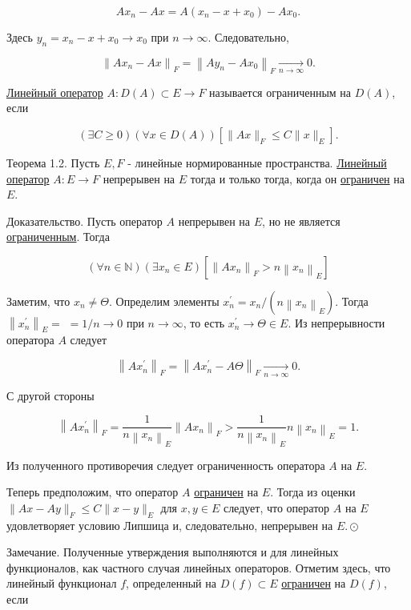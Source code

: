 \documentclass[a4paper, 12pt]{extarticle}
\begin{document}
$$
	A x_{n}-A x=A\left(x_{n}-x+x_{0}\right)-A x_{0} .
$$

Здесь $y_{n}=x_{n}-x+x_{0} \rightarrow x_{0}$ при $n \rightarrow \infty$. Следовательно,

$$
	\left\|A x_{n}-A x\right\|_{F}=\left\|A y_{n}-A x_{0}\right\|_{F} \underset{n \rightarrow \infty}{\longrightarrow} 0 .
$$

\hyperlink{linOperator}{Линейный оператор} $A: D(A) \subset E \rightarrow F$ называется \hypertarget{ogranichenn}{ограниченным} на $D(A)$, если

$$
	(\exists C \geq 0)(\forall x \in D(A))\left[\|A x\|_{F} \leq C\|x\|_{E}\right] .
$$

Теорема 1.2. Пусть $E, F$ - линейные нормированные пространства. \hyperlink{linOperator}{Линейный оператор} $A: E \rightarrow F$ непрерывен на $E$ тогда и только тогда, когда он \hyperlink{ogranichenn}{ограничен} на $E$.

Доказательство. Пусть оператор $A$ непрерывен на $E$, но не является \hyperlink{ogranichenn}{ограниченным}. Тогда

$$
	(\forall n \in \mathbb{N})\left(\exists x_{n} \in E\right)\left[\left\|A x_{n}\right\|_{F}>n\left\|x_{n}\right\|_{E}\right]
$$

Заметим, что $x_{n} \neq \Theta$. Определим элементы $x_{n}^{\prime}=x_{n} /\left(n\left\|x_{n}\right\|_{E}\right)$. Тогда $\left\|x_{n}^{\prime}\right\|_{E}=$ $=1 / n \rightarrow 0$ при $n \rightarrow \infty$, то есть $x_{n}^{\prime} \rightarrow \Theta \in E$. Из непрерывности оператора $A$ следует

$$
	\left\|A x_{n}^{\prime}\right\|_{F}=\left\|A x_{n}^{\prime}-A \Theta\right\|_{F} \underset{n \rightarrow \infty}{\longrightarrow} 0 .
$$

С другой стороны

$$
	\left\|A x_{n}^{\prime}\right\|_{F}=\frac{1}{n\left\|x_{n}\right\|_{E}}\left\|A x_{n}\right\|_{F}>\frac{1}{n\left\|x_{n}\right\|_{E}} n\left\|x_{n}\right\|_{E}=1 .
$$

Из полученного противоречия следует ограниченность оператора $A$ на $E$.

Теперь предположим, что оператор $A$ \hyperlink{ogranichenn}{ограничен} на $E$. Тогда из оценки $\|A x-A y\|_{F} \leq C\|x-y\|_{E}$ для $x, y \in E$ следует, что оператор $A$ на $E$ удовлетворяет условию Липшица и, следовательно, непрерывен на $E . \odot$

Замечание. Полученные утверждения выполняются и для линейных функционалов, как частного случая линейных операторов. Отметим здесь, что линейный функционал $f$, определенный на $D(f) \subset E$ \hyperlink{ogranichenn}{ограничен} на $D(f)$, если
\end{document}
